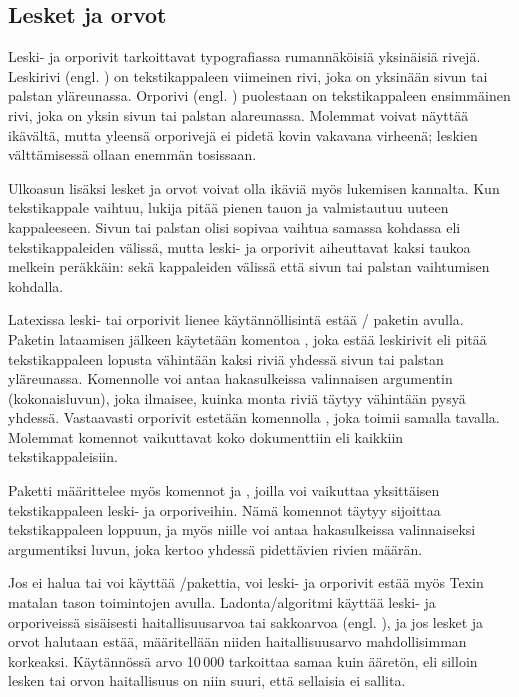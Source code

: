 \subsection{Lesket ja orvot}

Leski- ja orporivit tarkoittavat typografiassa rumannäköisiä yksinäisiä
rivejä. Leskirivi (engl. ) on tekstikappaleen viimeinen
rivi, joka on yksinään sivun tai palstan yläreunassa. Orporivi (engl.
) puolestaan on tekstikappaleen ensimmäinen rivi, joka
on yksin sivun tai palstan alareunassa. Molemmat voivat näyttää
ikävältä, mutta yleensä orporivejä ei pidetä kovin vakavana virheenä;
leskien välttämisessä ollaan enemmän tosissaan.

Ulkoasun lisäksi lesket ja orvot voivat olla ikäviä myös lukemisen
kannalta. Kun tekstikappale vaihtuu, lukija pitää pienen tauon ja
valmistautuu uuteen kappaleeseen. Sivun tai palstan olisi sopivaa
vaihtua samassa kohdassa eli tekstikappaleiden välissä, mutta leski- ja
orporivit aiheuttavat kaksi taukoa melkein peräkkäin: sekä kappaleiden
välissä että sivun tai palstan vaihtumisen kohdalla.

Latexissa leski- tai orporivit lienee käytännöllisintä estää
\-/ paketin avulla. Paketin lataamisen
jälkeen käytetään komentoa , joka estää leskirivit
eli pitää tekstikappaleen lopusta vähintään kaksi riviä yhdessä sivun
tai palstan yläreunassa. Komennolle voi antaa hakasulkeissa valinnaisen
argumentin (kokonaisluvun), joka ilmaisee, kuinka monta riviä täytyy
vähintään pysyä yhdessä. Vastaavasti orporivit estetään komennolla
, joka toimii samalla tavalla. Molemmat komennot
vaikuttavat koko dokumenttiin eli kaikkiin tekstikappaleisiin.

\begin{koodilohkosis}
  \usepackage{nowidow}
  \setnowidow   %
  \setnoclub    %
\end{koodilohkosis}

Paketti  määrittelee myös komennot 
ja , joilla voi vaikuttaa yksittäisen tekstikappaleen
leski- ja orporiveihin. Nämä komennot täytyy sijoittaa tekstikappaleen
loppuun, ja myös niille voi antaa hakasulkeissa valinnaiseksi
argumentiksi luvun, joka kertoo yhdessä pidettävien rivien määrän.

Jos ei halua tai voi käyttää \-/pakettia, voi leski- ja
orporivit estää myös Texin matalan tason toimintojen avulla.
Ladonta\-/algoritmi käyttää leski- ja orporiveissä sisäisesti
haitallisuusarvoa tai sakkoarvoa (engl. ), ja jos
lesket ja orvot halutaan estää, määritellään niiden haitallisuusarvo
mahdollisimman korkeaksi. Käytännössä arvo 10\,000 tarkoittaa samaa kuin
ääretön, eli silloin lesken tai orvon haitallisuus on niin suuri, että
sellaisia ei sallita.

